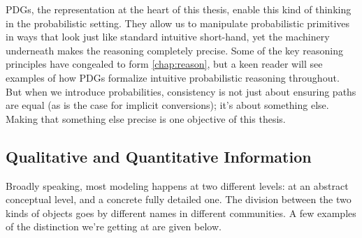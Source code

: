 PDGs, the representation at the heart of this thesis, enable this kind of thinking in the probabilistic setting.
They allow us to manipulate probabilistic primitives in ways that look just like standard intuitive short-hand, yet the machinery underneath makes the reasoning completely precise.
Some of the key reasoning principles have congealed to form \cref{chap:reason},
but a keen reader will see examples of how PDGs formalize intuitive probabilistic reasoning throughout. 
But when we introduce probabilities, consistency is not just about ensuring paths are equal 
    (as is the case for implicit conversions); it's about something else. 
Making that something else precise is one objective of this thesis. 
%


\subsection{Qualitative and Quantitative Information}

Broadly speaking, most modeling happens at two different levels: 
    at an abstract conceptual level, and a concrete fully detailed one.
The division between the two kinds of objects
    goes by different names in different communities. 
A few examples of the distinction we're getting at are given below.

